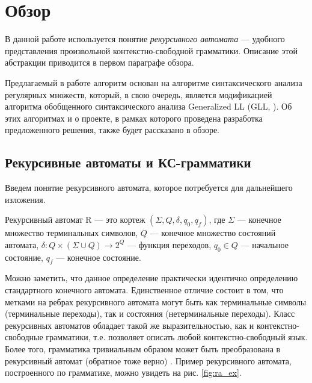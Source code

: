 \section{Обзор}

В данной работе используется понятие \textit{рекурсивного автомата} \cite{tellier2006ra} --- удобного представления произвольной контекстно-свободной грамматики.
Описание этой абстракции приводится в первом параграфе обзора.

Предлагаемый в работе алгоритм основан на алгоритме синтаксического анализа регулярных множеств, который, в свою очередь, является модификацией алгоритма обобщенного синтаксического анализа Generalized LL (GLL, \cite{gll}).
Об этих алгоритмах и о проекте, в рамках которого проведена разработка предложенного решения, также будет рассказано в обзоре.

\subsection{Рекурсивные автоматы и КС-грамматики}
Введем понятие рекурсивного автомата, которое потребуется для дальнейшего изложения.

\begin{defn}
	Рекурсивный автомат R --- это кортеж $(\Sigma, Q, \delta, q_0, q_f)$, где $\Sigma$ --- конечное множество терминальных символов, $Q$ --- конечное множество состояний автомата, $\delta : Q \times (\Sigma \cup Q) \rightarrow 2^Q$ --- функция переходов, $q_0 \in Q$ --- начальное состояние, $q_f$ --- конечное состояние. 
\end{defn}

Можно заметить, что данное определение практически идентично определению стандартного конечного автомата. 
Единственное отличие состоит в том, что метками на ребрах рекурсивного автомата могут быть как терминальные символы (терминальные переходы), так и состояния (нетерминальные переходы).
Класс рекурсивных автоматов обладает такой же выразительностью, как и контекстно-свободные грамматики, т.е. позволяет описать любой контекстно-свободный язык. 
Более того, грамматика тривиальным образом может быть преобразована в рекурсивный автомат (обратное тоже верно) \cite{tellier2006ra}. 
Пример рекурсивного автомата, построенного по грамматике, можно увидеть на рис. \ref{fig:ra_ex}.

